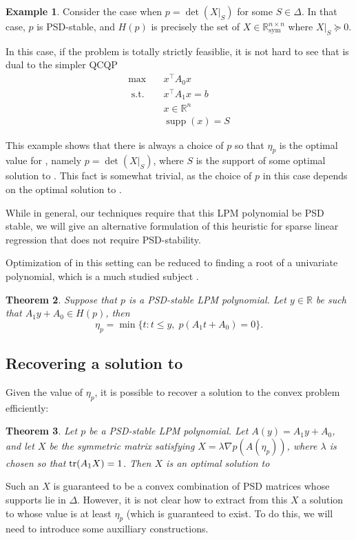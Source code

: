 \documentclass{amsart}
\newtheorem{theorem}{Theorem}[section]
\theoremstyle{definition}
\newtheorem{example}[theorem]{Example}
\newcommand{\R}{\mathbb{R}}
\newcommand{\tr}{\textup{tr}}
\DeclareMathOperator*{\supp}{supp}
\newcommand{\st}{{\text{ s.t. }}}
\newcommand*{\Sym}{\R^{n \times n}_{\mathrm{sym}}}
\begin{document}
\begin{example}
    Consider the case when $p = \det(X|_S)$ for some $S \in \Delta$. In that case, $p$ is PSD-stable, and $H(p)$ is precisely the set of $X \in \Sym$ where $X|_S \succeq 0$.

    In this case, if the problem is totally strictly feasiblie, it is not hard to see that  is dual to the simpler QCQP
    \begin{equation}
        \begin{aligned}
            \max\quad & x^{\intercal}A_0x\\
            \st & x^{\intercal}A_1x = b\\
                & x \in \R^n\\
                &\supp(x)  = S
        \end{aligned}
    \end{equation}

    This example shows that there is always a choice of $p$ so that $\eta_p$ is the optimal value for , namely $p = \det(X|_S)$, where $S$ is the support of some optimal solution to .
    This fact is somewhat trivial, as the choice of $p$ in this case depends on the optimal solution to .
\end{example}

While in general, our techniques require that this LPM polynomial be PSD stable, we will give an alternative formulation of this heuristic for sparse linear regression that does not require PSD-stability.

Optimization of  in this setting can be reduced to finding a root of a univariate polynomial, which is a much studied subject \cite{TODO}.
\begin{theorem}
    Suppose that $p$ is a PSD-stable LPM polynomial.
    Let $y \in \R$ be such that $A_1 y + A_0 \in H(p)$, then 
    \[
        \eta_p = \min \{t : t \le y,\; p(A_1 t + A_0) = 0\}.
    \]
\end{theorem}


\subsection{Recovering a solution to }
Given the value of $\eta_p$, it is possible to recover a solution to the convex problem  efficiently:
\begin{theorem}
    Let $p$ be a PSD-stable LPM polynomial.
    Let $A(y) = A_1 y + A_0$, and let $X$ be the symmetric matrix satisfying $X = \lambda \nabla p(A(\eta_p))$, where $\lambda$ is chosen so that $\tr(A_1X) = 1$.
    Then $X$ is an optimal solution to 
\end{theorem}
Such an $X$ is guaranteed to be a convex combination of PSD matrices whose supports lie in $\Delta$. However, it is not clear how to extract from this $X$ a solution to  whose value is at least $\eta_p$ (which is guaranteed to exist.
To do this, we will need to introduce some auxilliary constructions.
\end{document}
